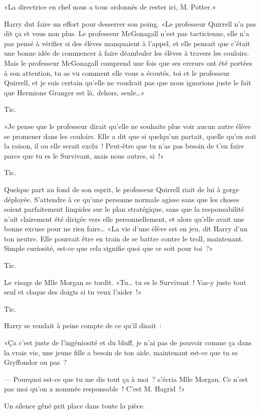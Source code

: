 «La directrice en chef nous a tous ordonnés de rester ici, M. Potter.»

Harry dut faire un effort pour desserrer son poing. «Le professeur Quirrell n'a pas dit ça et vous non plus. Le professeur McGonagall n'est pas tacticienne, elle n'a pas pensé à vérifier si des élèves manquaient à l'appel, et elle pensait que c'était une bonne idée de commencer à faire déambuler les élèves à travers les couloirs. Mais le professeur McGonagall comprend une fois que ses erreurs ont été portées à son attention, tu as vu comment elle vous a écoutés, toi et le professeur Quirrell, et je suis certain qu'elle ne voudrait pas que nous ignorions juste le fait que Hermione Granger est là, dehors, seule…»

Tic.

«Je pense que le professeur dirait qu'elle ne souhaite plus voir aucun autre élève se promener dans les couloirs. Elle a dit que si quelqu'un partait, quelle qu'en soit la raison, il ou elle serait exclu~! Peut-être que tu n'as pas besoin de t'en faire parce que tu es le Survivant, mais nous autres, si~!»

Tic.

Quelque part au fond de son esprit, le professeur Quirrell riait de lui à gorge déployée. S'attendre à ce qu'une personne normale agisse sans que les choses soient parfaitement limpides sur le plan stratégique, sans que la responsabilité n'ait clairement été dirigée vers elle personnellement, et alors qu'elle avait une bonne excuse pour ne rien faire… «La vie d'une élève est en jeu, dit Harry d'un ton neutre. Elle pourrait être en train de se battre contre le troll, maintenant. Simple curiosité, est-ce que cela signifie quoi que ce soit pour toi~?»

Tic.

Le visage de Mlle Morgan se tordit. «Tu… tu es le Survivant~! Vas-y juste tout seul et claque des doigts si tu veux l'aider~!»

Tic.

Harry se rendait à peine compte de ce qu'il disait~:

«Ça c'est juste de l'ingéniosité et du bluff, je n'ai pas de pouvoir comme ça dans la vraie vie, une jeune fille a besoin de ton aide, maintenant est-ce que tu es Gryffondor ou pas~?

--- Pourquoi est-ce que tu me dis tout ça à moi~? s'écria Mlle Morgan. Ce n'est pas moi qu'on a nommée responsable~! C'est M. Hagrid~!»

Un silence gêné prit place dans toute la pièce.

